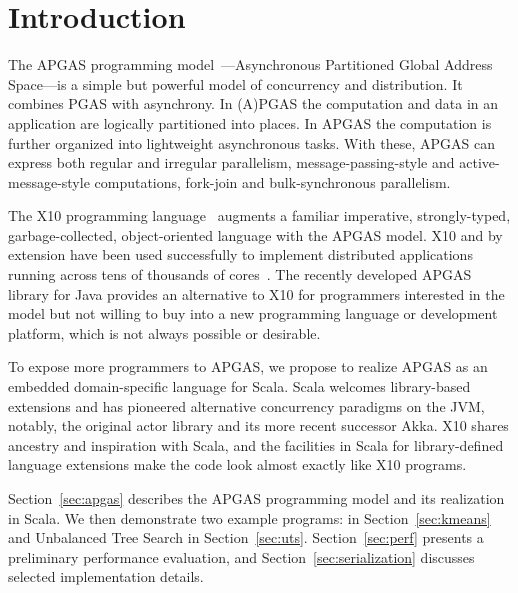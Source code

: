 \section*{Introduction}

The APGAS programming model~\cite{amp10}---Asynchronous Partitioned Global Address Space---is a simple but powerful
model of concurrency and distribution. It combines PGAS with asynchrony.
In (A)PGAS the computation and data in an application are logically partitioned into places.
In APGAS the computation is further organized into lightweight asynchronous tasks.
With these, APGAS can express both
regular and irregular parallelism, message-passing-style and
active-message-style computations, fork-join and bulk-synchronous
parallelism. %

The X10 programming language~\cite{oopsla05} augments a familiar imperative, strongly-typed, garbage-collected, object-oriented language with the APGAS model.
X10 and by extension
\apgas have been used successfully to implement distributed applications
running across tens of thousands of cores~\cite{TardieuETAL14X10ApgasAtPetascale}.
The recently developed APGAS library for Java \cite{APGASJava} provides an alternative to X10 for programmers interested in the \apgas model but not willing to buy into a new programming language or development platform, which is not always possible or desirable.

To expose more programmers to APGAS, we propose to realize APGAS as an embedded domain-specific language for Scala. 
Scala welcomes library-based extensions and has pioneered alternative concurrency paradigms on the JVM,
notably, the original actor library \cite{HallerOdersky07ActorsThatUnifyThreadsEvents} and its more recent successor Akka.
X10 shares ancestry and inspiration with Scala, and the
facilities in Scala for library-defined language extensions make the code look
almost exactly like X10 programs.

Section~\ref{sec:apgas} describes the APGAS programming model and its realization in Scala. We then demonstrate two example programs: \kmeans in Section~\ref{sec:kmeans} and Unbalanced Tree Search in Section~\ref{sec:uts}. Section~\ref{sec:perf} presents a preliminary performance evaluation, and Section~\ref{sec:serialization} discusses selected implementation details.



